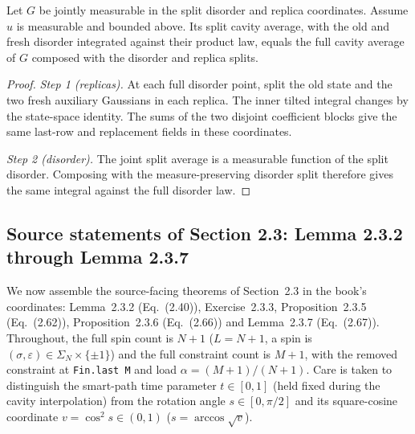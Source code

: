 \begin{theorem}\label{thm:sg-tal:perceptron-split-cavity-transport}
  \leanok
Let $G$ be jointly measurable in the split disorder and replica coordinates. Assume $u$
is measurable and bounded above. Its split cavity average, with the old and fresh disorder
integrated against their product law, equals the full cavity average of $G$ composed with
the disorder and replica splits.
\end{theorem}
\begin{proof}
  \leanok
\emph{Step 1 (replicas).} At each full disorder point, split the old state and the two
fresh auxiliary Gaussians in each replica. The inner tilted integral changes by the
state-space identity. The sums of the two disjoint coefficient blocks give the same
last-row and replacement fields in these coordinates.

\emph{Step 2 (disorder).} The joint split average is a measurable function of the
split disorder. Composing with the measure-preserving disorder split therefore gives
the same integral against the full disorder law.
\end{proof}

\subsection{Source statements of Section 2.3: Lemma 2.3.2 through Lemma 2.3.7}\label{sub:sg-tal:perceptron-cavity-source-results}

We now assemble the source-facing theorems of Section~2.3 in the book's coordinates:
Lemma~2.3.2 (Eq.~(2.40)), Exercise~2.3.3, Proposition~2.3.5 (Eq.~(2.62)),
Proposition~2.3.6 (Eq.~(2.66)) and Lemma~2.3.7 (Eq.~(2.67)). Throughout, the full spin count
is $N+1$ ($L=N+1$, a spin is $(\sigma,\varepsilon)\in\Sigma_N\times\{\pm1\}$) and the full
constraint count is $M+1$, with the removed constraint at \texttt{Fin.last M} and load
$\alpha=(M+1)/(N+1)$. Care is taken to distinguish the smart-path time parameter $t\in[0,1]$
(held fixed during the cavity interpolation) from the rotation angle $s\in[0,\pi/2]$ and its
square-cosine coordinate $v=\cos^2 s\in(0,1)$ ($s=\arccos\sqrt v$).

